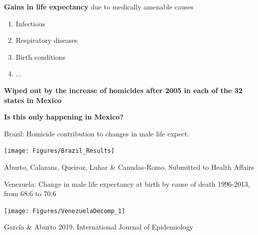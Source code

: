 \documentclass[xcolor={dvipsnames}]{beamer}
\begin{document}
\begin{frame}
	\LARGE{

		\begin{center}		
			\textbf{Gains in life expectancy} due to medically amenable causes
		\end{center}
		
		\begin{enumerate}
			\item Infectious
			\item Respiratory diseases 
			\item Birth conditions
			\item ...
		\end{enumerate}

	\pause

	\begin{center}
		\textbf{Wiped out by the increase of homicides after 2005 in each of the 32 states in Mexico}
	\end{center}				

}
\end{frame}


\begin{frame}
	\Huge{
	\begin{center}
		\bf{Is this only happening in Mexico?}
	\end{center}
	}
\end{frame}

\begin{frame}
	\begin{center}
		\large{Brazil: Homicide contribution to changes in male life expect.}
	\end{center}


	\begin{center}
		\texttt{[image: Figures/Brazil\_Results]}
	\end{center}
	
	\tiny{Aburto, Calazans, Queiroz, Luhar \& Canudas-Romo. Submitted to Health Affairs}	
\end{frame}


\begin{frame}
	\begin{center}
		\Large{Venezuela: Change in male life expectancy at birth by cause of death 1996-2013, from 68.6 to 70.6}
	\end{center}

	\begin{center}
		\texttt{[image: Figures/VenezuelaDecomp\_1]}
	\end{center}

	\tiny{Garc\'ia \& Aburto 2019. International Journal of Epidemiology}	
	
\end{frame}
\end{document}
